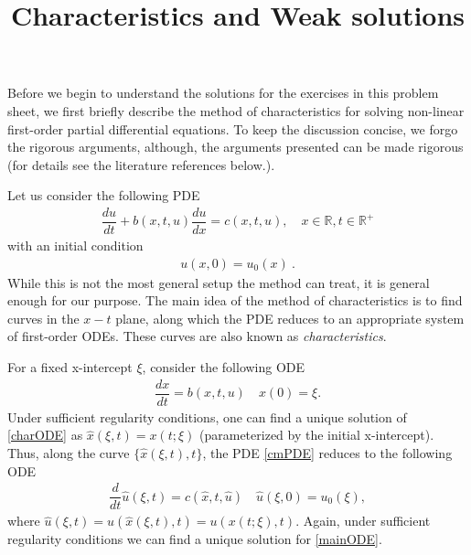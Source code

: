\documentclass[10pt,letterpaper]{article}
\newcommand{\frb}[1]{ \left(  {#1} \right) }
\theoremstyle{break}
\begin{document}
\title{Characteristics and Weak solutions}
\date{}
\author{}

\maketitle


















\begin{solutioninformation}
	Before we begin to understand the solutions for the exercises in this problem sheet,
	we first briefly describe the method of characteristics for solving non-linear first-order partial differential equations.
	To keep the discussion concise, we forgo the rigorous arguments, although,
	the arguments presented can be made rigorous (for details see the literature references below.).

	Let us consider the following PDE
	\begin{gather} \label{cmPDE}
		\dfrac{du}{dt}+b\frb{x,t,u} \dfrac{du}{dx}=c\frb{x,t,u}, \quad x \in \mathbb{R}, t \in \mathbb{R}^+
	\end{gather}
	with an initial condition
	\begin{gather} \label{cmIC}
		u(x,0)=u_0(x)\ .
	\end{gather}
	While this is not the most general setup the method can treat, it is general enough for our purpose.
	The main idea of the method of characteristics is to find curves in the $x-t$ plane, along which the PDE reduces to an appropriate system of first-order ODEs. These curves are also known as \textit{characteristics}. 

	For a fixed x-intercept $\xi$, consider the following ODE
	\begin{gather} \label{charODE}
		\dfrac{dx}{dt} =b\frb{x,t,u}
		\quad
		x(0) = \xi.
	\end{gather}
	Under sufficient regularity conditions, one can find a unique solution of \eqref{charODE} as $\hat x (\xi,t) = x(t;\xi)$ (parameterized by the initial x-intercept). Thus, along the curve $\{\hat x (\xi,t), t\}$, the PDE \eqref{cmPDE} reduces to the following ODE
	\begin{gather} \label{mainODE}
		\dfrac{d}{dt}\hat u \frb{\xi,t}=c\frb{\hat x,t,\hat u} \quad \hat u\frb{\xi,0}=u_0\frb{\xi},
	\end{gather}
	where $\hat u(\xi,t) = u( \hat x(\xi,t),t) = u( x(t;\xi),t)$. Again, under sufficient regularity conditions we can find a unique solution for \eqref{mainODE}.


\end{solutioninformation}
\end{document}
